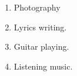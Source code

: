 %
%
%


\begin{enumerate}
	
	\item Photography
	\item Lyrics writing.
	\item Guitar playing.
	\item Listening music.
\end{enumerate}
